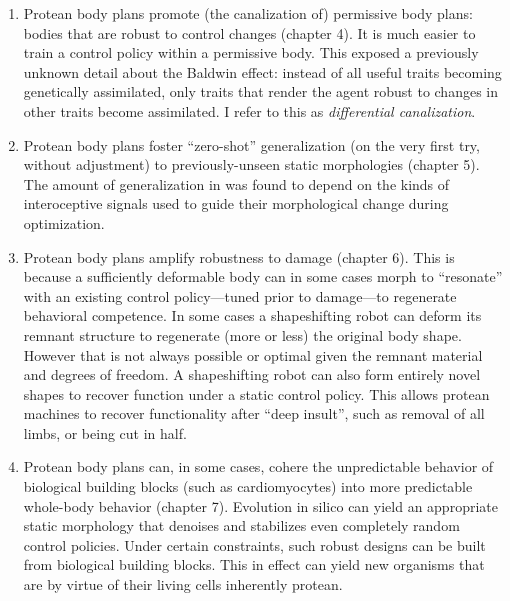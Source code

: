 \begin{enumerate}
    \item Protean body plans promote (the canalization of) permissive body plans:
    bodies that are robust to control changes (chapter 4).
    It is much easier to train a control policy within a permissive body. 
    This exposed a previously unknown detail about the Baldwin effect: instead of all useful traits becoming genetically assimilated, only traits that render the agent robust to changes in other traits become assimilated. 
    I refer to this as \textit{differential canalization}.
    
    \item Protean body plans foster ``zero-shot'' generalization \cite{socher2013zero} (on the very first try, without adjustment) to 
    previously-unseen static morphologies
    (chapter 5).
    The amount of generalization in was found to depend on the kinds of interoceptive signals used to guide their morphological change during optimization.
    
    \item Protean body plans amplify robustness to damage (chapter 6).
    This is because a sufficiently deformable body can in some cases morph to ``resonate'' with an existing control policy---tuned prior to damage---to regenerate behavioral competence.
    In some cases a shapeshifting robot can deform its remnant structure to regenerate (more or less) the original body shape.
    However that is not always possible or optimal given the remnant material and degrees of freedom.
    A shapeshifting robot can also form entirely novel shapes to recover function under a static control policy.
    This allows protean machines to recover functionality after ``deep insult'', such as removal of all limbs, or being cut in half.
    
    \item Protean body plans 
    can, in some cases, cohere the unpredictable behavior of biological building blocks (such as cardiomyocytes) into more predictable whole-body behavior (chapter 7).
    Evolution in silico can yield an appropriate static morphology that denoises and stabilizes even completely random control policies.
    Under certain constraints, such robust designs can be built from biological building blocks.
    This in effect can yield new organisms that are by virtue of their living cells inherently protean.
    

\end{enumerate}
